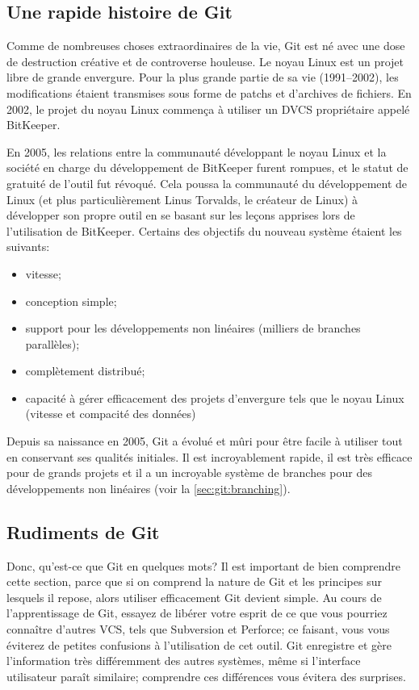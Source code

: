 \subsection{Une rapide histoire de Git}

Comme de nombreuses choses extraordinaires de la vie, Git est né avec une dose de destruction créative et de controverse houleuse.
Le noyau Linux est un projet libre de grande envergure.
Pour la plus grande partie de sa vie (1991–2002), les modifications étaient transmises sous forme de patchs et d'archives de fichiers.
En 2002, le projet du noyau Linux commença à utiliser un DVCS propriétaire appelé BitKeeper.

En 2005, les relations entre la communauté développant le noyau Linux et la société en charge du développement de BitKeeper furent rompues, et le statut de gratuité de l'outil fut révoqué.
Cela poussa la communauté du développement de Linux (et plus particulièrement Linus Torvalds, le créateur de Linux) à développer son propre outil en se basant sur les leçons apprises lors de l'utilisation de BitKeeper.
Certains des objectifs du nouveau système étaient les suivants:

\begin{itemize}
\item vitesse;
\item conception simple;
\item support pour les développements non linéaires (milliers de branches parallèles);
\item complètement distribué;
\item capacité à gérer efficacement des projets d'envergure tels que le noyau Linux (vitesse et compacité des données)
\end{itemize}

Depuis sa naissance en 2005, Git a évolué et mûri pour être facile à utiliser tout en conservant ses qualités initiales.
Il est incroyablement rapide, il est très efficace pour de grands projets et il a un incroyable système de branches pour des développements non linéaires (voir la \autoref{sec:git:branching}).

\subsection{Rudiments de Git}

Donc, qu'est-ce que Git en quelques mots?
Il est important de bien comprendre cette section, parce que si on comprend la nature de Git et les principes sur lesquels il repose, alors utiliser efficacement Git devient simple.
Au cours de l'apprentissage de Git, essayez de libérer votre esprit de ce que vous pourriez connaître d'autres VCS, tels que Subversion et Perforce;
ce faisant, vous vous éviterez de petites confusions à l'utilisation de cet outil.
Git enregistre et gère l'information très différemment des autres systèmes, même si l'interface utilisateur paraît similaire;
comprendre ces différences vous évitera des surprises.


